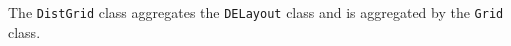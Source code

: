 %


The {\tt DistGrid} class aggregates the {\tt DELayout} class and is
aggregated by the {\tt Grid} class.
